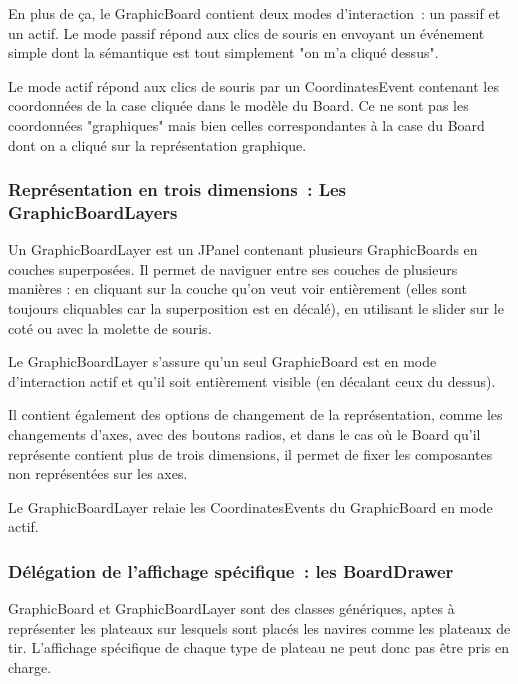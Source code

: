 	En plus de ça, le GraphicBoard contient deux modes d'interaction~: un passif et un actif.
Le mode passif répond aux clics de souris en envoyant un événement simple dont la sémantique est tout simplement "on m'a cliqué dessus". \newline

	Le mode actif répond aux clics de souris par un CoordinatesEvent contenant les coordonnées de la case cliquée dans le modèle du Board. Ce ne sont pas les coordonnées "graphiques" mais bien celles correspondantes à la case du Board dont on a cliqué sur la représentation graphique.

\subsubsection{Représentation en trois dimensions~: Les GraphicBoardLayers}
	Un GraphicBoardLayer est un JPanel contenant plusieurs GraphicBoards en couches superposées.
Il permet de naviguer entre ses couches de plusieurs manières : en cliquant sur la couche qu'on veut voir entièrement (elles sont toujours cliquables car la superposition est en décalé), en utilisant le slider sur le coté ou avec la molette de souris.
\newline

	Le GraphicBoardLayer s'assure qu'un seul GraphicBoard est en mode d'interaction actif et qu'il soit entièrement visible (en décalant ceux du dessus).
	\newline
	
	Il contient également des options de changement de la représentation, comme les changements d'axes, avec des boutons radios, et dans le cas où le Board qu'il représente contient plus de trois dimensions, il permet de fixer les composantes non représentées sur les axes.
\newline

Le GraphicBoardLayer relaie les CoordinatesEvents du GraphicBoard en mode actif.

\subsubsection{Délégation de l'affichage spécifique~: les BoardDrawer}

	GraphicBoard et GraphicBoardLayer sont des classes génériques, aptes à représenter les plateaux sur lesquels sont placés les navires comme les plateaux de tir. L'affichage spécifique de chaque type de plateau ne peut donc pas être pris en charge.\newline
	

